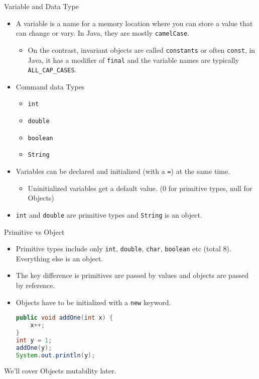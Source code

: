\documentclass[aspectratio=169]{beamer}
\begin{document}
\begin{frame}[fragile]{Variable and Data Type}
\begin{itemize}
    \item A variable is a name for a memory location where you can store a value that can \alert{change or vary}. In Java, they are mostly \verb|camelCase|.
    \begin{itemize}
        \item On the contrast, invariant objects are called \verb|constants| or often \verb|const|, in Java, it has a modifier of \verb|final| and the variable names are typically \verb|ALL_CAP_CASES|.
    \end{itemize}
    \item Command data Types
    \begin{itemize}
        \item \verb|int|
        \item \verb|double|
        \item \verb|boolean|
        \item \verb|String|
    \end{itemize}
    \item Variables can be declared and initialized (with a \verb|=|) at the same time.
    \begin{itemize}
        \item Uninitialized variables get a default value. (0 for primitive types, null for Objects)
    \end{itemize}
    \item \verb|int| and \verb|double| are primitive types and \verb|String| is an object.
\end{itemize}
\end{frame}

\begin{frame}[fragile]{Primitive vs Object}
    \begin{itemize}
        \item Primitive types include only \verb|int|, \verb|double|, \verb|char|, \verb|boolean| etc (total 8). Everything else is an object.
        \item The key difference is primitives are passed by \alert{values} and objects are passed by \alert{reference}.
        \item Objects have to be initialized with a \verb|new| keyword.
        \begin{lstlisting}[language=Java,basicstyle=\small,style=mystyle]
public void addOne(int x) {
    x++;
}
int y = 1;
addOne(y);
System.out.println(y);
\end{lstlisting}
    \end{itemize}
    We'll cover Objects mutability later.
\end{frame}
\end{document}
